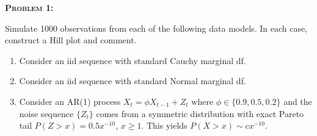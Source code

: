 \documentclass[12pt,oneside]{article}
\newenvironment{problem}[1]
{\begin{mdframed}
        \textbf{\textsc{Problem #1:}}
}
{\end{mdframed}}
\begin{document}




\begin{problem}{1}
Simulate 1000 observations from each of the following data models. In each case, construct a Hill plot and comment.
\begin{enumerate}
    \item Consider an iid sequence with standard Cauchy marginal df.
    \item  Consider an iid sequence with standard Normal marginal df.
    \item Consider an AR(1) process $X_t = \phi X_{t-1} + Z_t$ where $\phi \in \{0.9, 0.5, 0.2\}$ and the noise sequence $\{Z_t\}$ comes from a symmetric distribution with exact Pareto tail $P(Z > x) =0.5x^{-10}$, $x \geq 1$. This yields $P(X > x) \sim cx^{-10}$.
\end{enumerate}
\end{problem}
\end{document}
